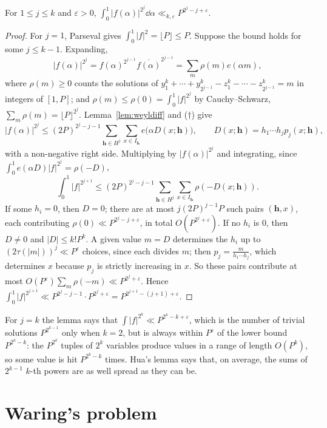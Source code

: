 \begin{theorem}[Hua, 1938]\label{thm:hua}
For $1\le j\le k$ and $\varepsilon>0$, $\displaystyle\int_0^1|f(\alpha)|^{2^j}\dd\alpha\ll_{k,\varepsilon}P^{2^j-j+\varepsilon}$.
\end{theorem}
\begin{proof}
For $j=1$, Parseval gives $\int_0^1|f|^2=\lfloor P\rfloor\le P$. Suppose the bound holds for some $j\le k-1$. Expanding,
\[
|f(\alpha)|^{2^j}=f(\alpha)^{2^{j-1}}\overline{f(\alpha)}^{2^{j-1}}=\sum_m\rho(m)e(\alpha m),
\]
where $\rho(m)\ge0$ counts the solutions of $y_1^k+\cdots+y_{2^{j-1}}^k-z_1^k-\cdots-z_{2^{j-1}}^k=m$ in integers of $[1,P]$; and $\rho(m)\le\rho(0)=\int_0^1|f|^{2^j}$ by Cauchy--Schwarz, $\sum_m\rho(m)=\lfloor P\rfloor^{2^j}$. Lemma~\ref{lem:weyldiff} and ($\dagger$) give
\[
|f(\alpha)|^{2^j}\le(2P)^{2^j-j-1}\sum_{\mathbf h\in H^j}\sum_{x\in I_{\mathbf h}}e\bigl(\alpha D(x;\mathbf h)\bigr),\qquad D(x;\mathbf h)=h_1\cdots h_jp_j(x;\mathbf h),
\]
with a non-negative right side. Multiplying by $|f(\alpha)|^{2^j}$ and integrating, since $\int_0^1e(\alpha D)|f|^{2^j}=\rho(-D)$,
\[
\int_0^1|f|^{2^{j+1}}\le(2P)^{2^j-j-1}\sum_{\mathbf h\in H^j}\sum_{x\in I_{\mathbf h}}\rho(-D(x;\mathbf h)).
\]
If some $h_i=0$, then $D=0$; there are at most $j(2P)^{j-1}P$ such pairs $(\mathbf h,x)$, each contributing $\rho(0)\ll P^{2^j-j+\varepsilon}$, in total $O(P^{2^j+\varepsilon})$. If no $h_i$ is $0$, then $D\ne0$ and $|D|\le k!P^k$. A given value $m=D$ determines the $h_i$ up to $(2\tau(|m|))^j\ll P^\varepsilon$ choices, since each divides $m$; then $p_j=\frac m{h_1\cdots h_j}$, which determines $x$ because $p_j$ is strictly increasing in $x$. So these pairs contribute at most $O(P^\varepsilon)\sum_m\rho(-m)\ll P^{2^j+\varepsilon}$. Hence $\int_0^1|f|^{2^{j+1}}\ll P^{2^j-j-1}\cdot P^{2^j+\varepsilon}=P^{2^{j+1}-(j+1)+\varepsilon}$.
\end{proof}

For $j=k$ the lemma says that $\int|f|^{2^k}\ll P^{2^k-k+\varepsilon}$, which is the number of trivial solutions $P^{2^{k-1}}$ only when $k=2$, but is always within $P^\varepsilon$ of the lower bound $P^{2^k-k}$: the $P^{2^k}$ tuples of $2^k$ variables produce values in a range of length $O(P^k)$, so some value is hit $P^{2^k-k}$ times. Hua's lemma says that, on average, the sums of $2^{k-1}$ $k$-th powers are as well spread as they can be.

\section{Waring's problem}

